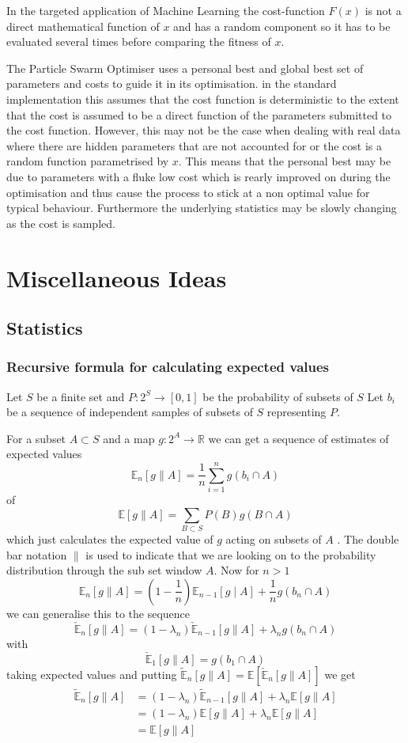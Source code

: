 \documentclass[a4paper,oneside,english]{book}
\numberwithin{equation}{section}
\numberwithin{figure}{section}
\begin{document}
In the targeted application of Machine Learning the cost-function $F(x)$ is not a direct mathematical function of $x$ and has a random component so it has to be evaluated several times before comparing the fitness of $x$. 

The Particle Swarm Optimiser uses a personal best and global best
set of parameters and costs to guide it in its optimisation. in the
standard implementation this assumes that the cost function is deterministic
to the extent that the cost is assumed to be a direct function of
the parameters submitted to the cost function. However, this may not
be the case when dealing with real data where there are hidden parameters
that are not accounted for or the cost is a random function parametrised
by $x$. This means that the personal best may be due
to parameters with a fluke low cost which is rearly improved on during
the optimisation and thus cause the process to stick at a non optimal
value for typical behaviour. Furthermore the underlying statistics
may be slowly changing as the cost is sampled. 
\part{Miscellaneous Ideas}
\chapter{Statistics}
\section{Recursive formula for calculating expected values}

Let $S$ be a finite set and $P:2^S \longrightarrow [0,1]$ be the probability of subsets of $S$
Let $b_{i}$ be a sequence of independent samples of subsets of $S$ 
representing $P$. 

For a subset $A\subset S$ and a map $g:2^{A}\rightarrow\mathbb{R}$
we can get a sequence of estimates of expected values
\[
\mathbb{E}_{n}[g\parallel A]=\frac{1}{n}\sum_{i=1}^{n}g(b_{i}\cap A)
\]
of 
\[
\mathbb{E}[g\parallel A]=\sum_{B\subset S}P(B)g(B\cap A)
\]
which just calculates the expected value of $g$ acting on subsets
of $A$ . The double bar notation $\parallel$ is used to indicate
that we are looking on to the probability distribution through the
sub set window $A$. Now for $n>1$ 
\[
\mathbb{E}_{n}[g\parallel A]=\left(1-\frac{1}{n}\right)\mathbb{E}_{n-1}[g\mid A]+\frac{1}{n}g(b_{n}\cap A)
\]
we can generalise this to the sequence 
\[
\check{\mathbb{E}}_{n}[g\parallel A]=\left(1-\lambda_{n}\right)\mathbb{\check{E}}_{n-1}[g\parallel A]+\lambda_{n}g(b_{n}\cap A)
\]
with 
\[
\check{\mathbb{E}}_{1}[g\parallel A]=g(b_{1}\cap A)
\]
taking expected values and putting $\mathbb{\tilde{E}}_{n}[g\parallel A]=\mathbb{E}\left[\check{\mathbb{E}}_{n}[g\parallel A]\right]$
we get
\begin{align}
\mathbb{\tilde{E}}_{n}[g\parallel A] & = (1-\lambda_{n})\mathbb{\tilde{E}}_{n-1}[g\parallel A]+\lambda_{n}\mathbb{E}[g\parallel A]\\
& = (1-\lambda_{n})\mathbb{\mathbb{E}}[g\parallel A]+\lambda_{n}\mathbb{E}[g\parallel A]\\
& = \mathbb{E}[g\parallel A]
\end{align}
\end{document}
